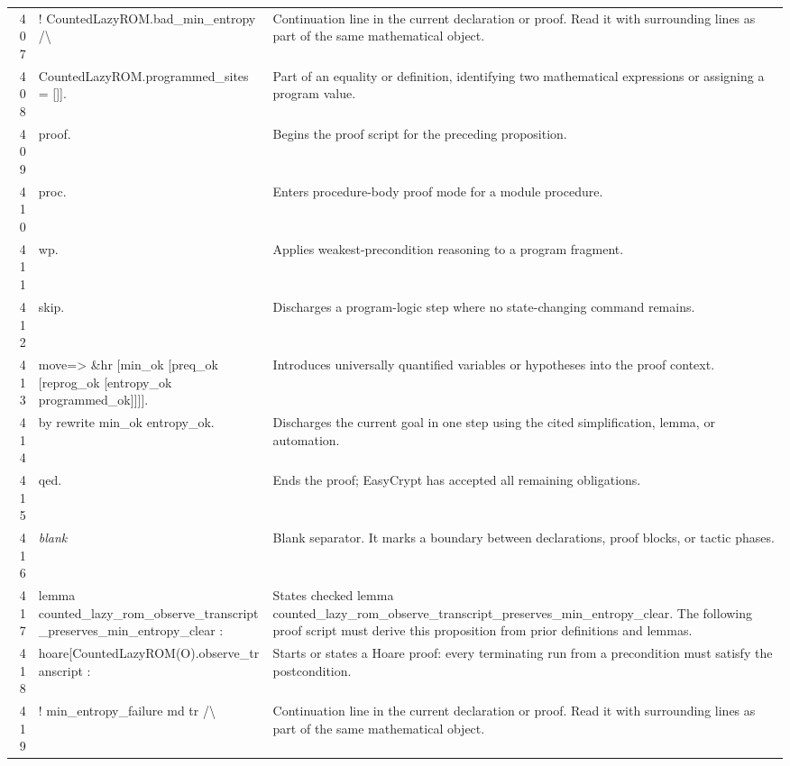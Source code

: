 \documentclass[10pt]{article}
\begin{document}
\begin{longtable}{r L{0.53\textwidth} L{0.37\textwidth}}
407 & {\ttfamily\scriptsize     ! CountedLazyROM.bad\_min\_entropy /\textbackslash{}} & Continuation line in the current declaration or proof.  Read it with surrounding lines as part of the same mathematical object. \\
408 & {\ttfamily\scriptsize     CountedLazyROM.programmed\_sites = []].} & Part of an equality or definition, identifying two mathematical expressions or assigning a program value. \\
409 & {\ttfamily\scriptsize proof.} & Begins the proof script for the preceding proposition. \\
410 & {\ttfamily\scriptsize proc.} & Enters procedure-body proof mode for a module procedure. \\
411 & {\ttfamily\scriptsize wp.} & Applies weakest-precondition reasoning to a program fragment. \\
412 & {\ttfamily\scriptsize skip.} & Discharges a program-logic step where no state-changing command remains. \\
413 & {\ttfamily\scriptsize move=> \&hr [min\_ok [preq\_ok [reprog\_ok [entropy\_ok programmed\_ok]]]].} & Introduces universally quantified variables or hypotheses into the proof context. \\
414 & {\ttfamily\scriptsize by rewrite min\_ok entropy\_ok.} & Discharges the current goal in one step using the cited simplification, lemma, or automation. \\
415 & {\ttfamily\scriptsize qed.} & Ends the proof; EasyCrypt has accepted all remaining obligations. \\
416 & {\ttfamily\scriptsize \emph{blank}} & Blank separator.  It marks a boundary between declarations, proof blocks, or tactic phases. \\
417 & {\ttfamily\scriptsize lemma counted\_lazy\_rom\_observe\_transcript\_preserves\_min\_entropy\_clear :} & States checked lemma counted\_lazy\_rom\_observe\_transcript\_preserves\_min\_entropy\_clear.  The following proof script must derive this proposition from prior definitions and lemmas. \\
418 & {\ttfamily\scriptsize   hoare[CountedLazyROM(O).observe\_transcript :} & Starts or states a Hoare proof: every terminating run from a precondition must satisfy the postcondition. \\
419 & {\ttfamily\scriptsize     ! min\_entropy\_failure md tr /\textbackslash{}} & Continuation line in the current declaration or proof.  Read it with surrounding lines as part of the same mathematical object. \\

\end{longtable}
\end{document}
